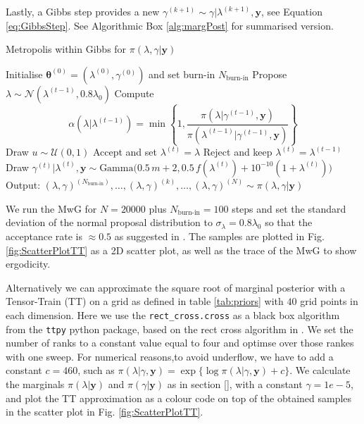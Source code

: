 Lastly, a Gibbs step provides a new $\gamma^{(k+1)} \sim \gamma | \lambda^{(k+1)}, \bm{y}$, see Equation \eqref{eq:GibbsStep}.
See Algorithmic Box \ref{alg:margPost} for summarised version.
\begin{algorithm}[!ht]
	\caption{Metropolis within Gibbs for $\pi(\lambda, \gamma | \bm{y})$}
	\begin{algorithmic}[1]
		\STATE Initialise  \( \bm{\theta}^{(0)}  =( \lambda^{(0)} , \gamma^{(0)}  ) \) and set burn-in $N_{\text{burn-in}}$
		\STATE Propose \( \lambda \sim \mathcal{N}(\lambda^{(t-1)}, 0.8 \lambda_0)  \)
		\STATE Compute
		\[ \alpha( \lambda  | \lambda^{(t-1)}) = \min \left\{ 1, \frac{\pi(\lambda | \gamma^{(t-1)}, \bm{y})  }{\pi(\lambda^{(t-1)}| \gamma^{(t-1)}, \bm{y})}  \right\} \]
		\STATE Draw $u \sim \mathcal{U}(0,1)$
		\STATE Accept and set \( \lambda^{(t)} = \lambda \)
		\ELSE  
		\STATE Reject and keep \(\lambda^{(t)} = \lambda^{(t-1)} \)
		\ENDIF
		\STATE Draw $\gamma^{(t)} | \lambda^{(t)} ,\bm{y} \sim \text{Gamma} \big( 0.5  \, m + 2, 0.5 \, f(\lambda^{(t)}) + 10^{-10}(1 + \lambda^{(t)}) \big) $
		\ENDFOR
		\STATE Output: $ (\lambda, \gamma)^{(N_{\text{burn-in}})}, \dots,  (\lambda, \gamma)^{(k)} , \dots,   (\lambda, \gamma)^{(N)} \sim \pi(\lambda, \gamma| \bm{y}) $
	\end{algorithmic}
	\label{alg:margPost}
\end{algorithm}



We run the MwG for $N = 20000$ plus $N_{\text{burn-in}} = 100$ steps and set the standard deviation of the normal proposal distribution to $\sigma_{\lambda} = 0.8 \lambda_0$ so that the acceptance rate is $\approx 0.5$ as suggested in \cite{}.
The samples are plotted in Fig. \ref{fig:ScatterPlotTT} as a 2D scatter plot, as well as the trace of the MwG to show ergodicity.


Alternatively we can approximate the square root of marginal posterior with a Tensor-Train (TT) on a grid as defined in table \ref{tab:priors} with $40$ grid points in each dimension.
Here we use the \texttt{rect\_cross.cross} as a black box algorithm from the \texttt{ttpy} python package, based on the rect cross algorithm in \cite{}.
We set the number of ranks to a constant value equal to four and optimse over those rankes with one sweep.
For numerical reasons,to avoid underflow, we have to add a constant $c = 460$, such as $\pi(\lambda | \gamma ,\bm{y}) = \exp\{ \log{\pi(\lambda | \gamma, \bm{y})} + c\}$.
We calculate the marginals $\pi(\lambda| \bm{y})$ and $\pi(\gamma| \bm{y})$ as in section \ref{}, with a constant $\gamma = 1e-5 $, and plot the TT approximation as a colour code on top of the obtained samples in the scatter plot in Fig. \ref{fig:ScatterPlotTT}.



